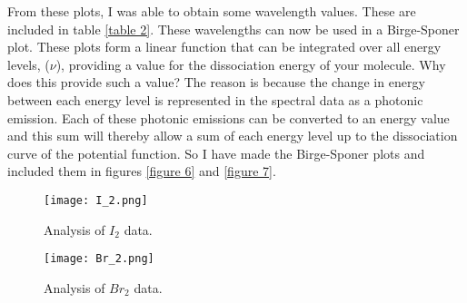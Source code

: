 \documentclass[letterpaper,12pt]{article}
\begin{document}
From these plots, I was able to obtain some wavelength values. These are included in table \ref{table 2}. These wavelengths can now be used in a Birge-Sponer plot. These plots form a linear function that can be integrated over all energy levels, ($\nu$), providing a value for the dissociation energy of your molecule. Why does this provide such a value? The reason is because the change in energy between each energy level is represented in the spectral data as a photonic emission. Each of these photonic emissions can be converted to an energy value and this sum will thereby allow a sum of each energy level up to the dissociation curve of the potential function. So I have made the Birge-Sponer plots and included them in figures \ref{figure 6} and \ref{figure 7}.
\begin{figure}[!h]
\centering
\texttt{[image: I\_2.png]}
\caption{Analysis of $I_2$ data.}
\label{figure 4}
\end{figure}\newline
\begin{figure}[!h]
\centering
\texttt{[image: Br\_2.png]}
\caption{Analysis of $Br_2$ data.}
\label{figure 5}
\end{figure}\newline
\end{document}
